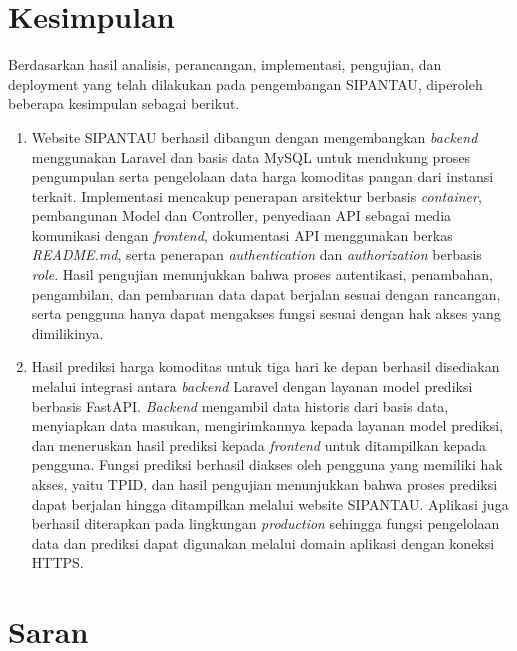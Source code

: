 

\section{Kesimpulan}

Berdasarkan hasil analisis, perancangan, implementasi, pengujian, dan deployment yang telah dilakukan pada pengembangan SIPANTAU, diperoleh beberapa kesimpulan sebagai berikut.

\begin{enumerate}
    \item Website SIPANTAU berhasil dibangun dengan mengembangkan \textit{backend} menggunakan Laravel dan basis data MySQL untuk mendukung proses pengumpulan serta pengelolaan data harga komoditas pangan dari instansi terkait. Implementasi mencakup penerapan arsitektur berbasis \textit{container}, pembangunan Model dan Controller, penyediaan API sebagai media komunikasi dengan \textit{frontend}, dokumentasi API menggunakan berkas \textit{README.md}, serta penerapan \textit{authentication} dan \textit{authorization} berbasis \textit{role}. Hasil pengujian menunjukkan bahwa proses autentikasi, penambahan, pengambilan, dan pembaruan data dapat berjalan sesuai dengan rancangan, serta pengguna hanya dapat mengakses fungsi sesuai dengan hak akses yang dimilikinya.
    
    \item Hasil prediksi harga komoditas untuk tiga hari ke depan berhasil disediakan melalui integrasi antara \textit{backend} Laravel dengan layanan model prediksi berbasis FastAPI. \textit{Backend} mengambil data historis dari basis data, menyiapkan data masukan, mengirimkannya kepada layanan model prediksi, dan meneruskan hasil prediksi kepada \textit{frontend} untuk ditampilkan kepada pengguna. Fungsi prediksi berhasil diakses oleh pengguna yang memiliki hak akses, yaitu TPID, dan hasil pengujian menunjukkan bahwa proses prediksi dapat berjalan hingga ditampilkan melalui website SIPANTAU. Aplikasi juga berhasil diterapkan pada lingkungan \textit{production} sehingga fungsi pengelolaan data dan prediksi dapat digunakan melalui domain aplikasi dengan koneksi HTTPS.
\end{enumerate}

\section{Saran}


